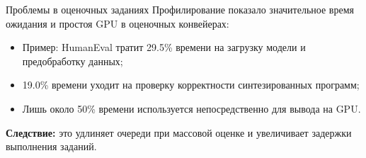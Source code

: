 \begin{frame}{Проблемы в оценочных заданиях}
	Профилирование показало значительное время ожидания и простоя GPU в оценочных конвейерах:
	\begin{itemize}
		\item Пример: HumanEval тратит 29.5\% времени на загрузку модели и предобработку данных;
		\item 19.0\% времени уходит на проверку корректности синтезированных программ;
		\item Лишь около 50\% времени используется непосредственно для вывода на GPU.
	\end{itemize}
	
	\textbf{Следствие:} это удлиняет очереди при массовой оценке и увеличивает задержки выполнения заданий.
\end{frame}